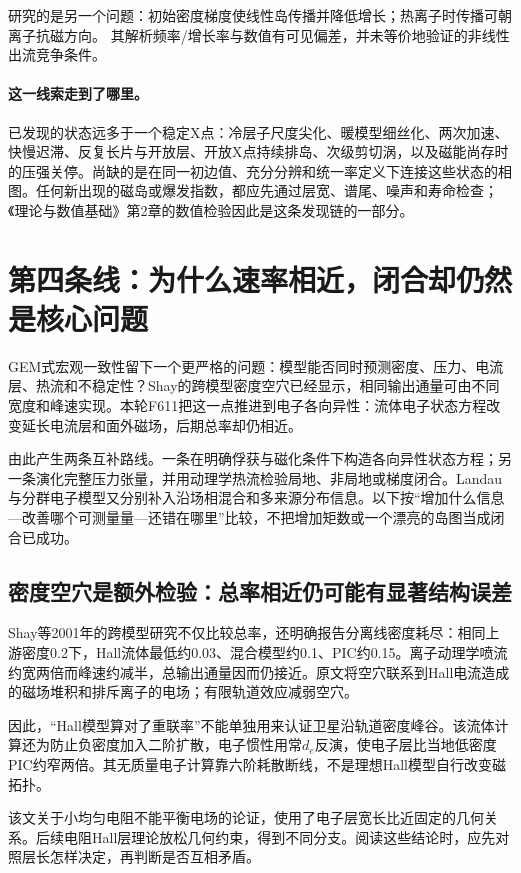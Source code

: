 \documentclass[UTF8,a4paper,11pt,openany,fontset=fandol]{ctexbook}
\begin{document}
\citet{E472}研究的是另一个问题：初始密度梯度使线性岛传播并降低增长；热离子时传播可朝离子抗磁方向。
其解析频率/增长率与数值有可见偏差，并未等价地验证\citet{L174}的非线性出流竞争条件。

\paragraph{这一线索走到了哪里。}已发现的状态远多于一个稳定X点：冷层子尺度尖化、暖模型细丝化、两次加速、快慢迟滞、反复长片与开放层、开放X点持续排岛、次级剪切涡，以及磁能尚存时的压强关停。尚缺的是在同一初边值、充分分辨和统一率定义下连接这些状态的相图。任何新出现的磁岛或爆发指数，都应先通过层宽、谱尾、噪声和寿命检查；《理论与数值基础》第2章的数值检验因此是这条发现链的一部分。

\section{第四条线：为什么速率相近，闭合却仍然是核心问题}\label{story:closure}
GEM式宏观一致性留下一个更严格的问题：模型能否同时预测密度、压力、电流层、热流和不稳定性？Shay的跨模型密度空穴已经显示，相同输出通量可由不同宽度和峰速实现。本轮F611把这一点推进到电子各向异性：流体电子状态方程改变延长电流层和面外磁场，后期总率却仍相近。

由此产生两条互补路线。一条在明确俘获与磁化条件下构造各向异性状态方程；另一条演化完整压力张量，并用动理学热流检验局地、非局地或梯度闭合。Landau与分群电子模型又分别补入沿场相混合和多来源分布信息。以下按“增加什么信息—改善哪个可测量量—还错在哪里”比较，不把增加矩数或一个漂亮的岛图当成闭合已成功。

\subsection{密度空穴是额外检验：总率相近仍可能有显著结构误差}
Shay等2001年的跨模型研究不仅比较总率，还明确报告分离线密度耗尽：相同上游密度0.2下，Hall流体最低约0.03、混合模型约0.1、PIC约0.15。离子动理学喷流约宽两倍而峰速约减半，总输出通量因而仍接近。原文将空穴联系到Hall电流造成的磁场堆积和排斥离子的电场；有限轨道效应减弱空穴。\citep{Shay2001}

因此，“Hall模型算对了重联率”不能单独用来认证卫星沿轨道密度峰谷。该流体计算还为防止负密度加入二阶扩散，电子惯性用常$d_e$反演，使电子层比当地低密度PIC约窄两倍。其无质量电子计算靠六阶耗散断线，不是理想Hall模型自行改变磁拓扑。

该文关于小均匀电阻不能平衡电场的论证，使用了电子层宽长比近固定的几何关系。后续电阻Hall层理论放松几何约束，得到不同分支。阅读这些结论时，应先对照层长怎样决定，再判断是否互相矛盾。\citep{Shay2001,Malyshkin2008,Simakov2009}
\end{document}
